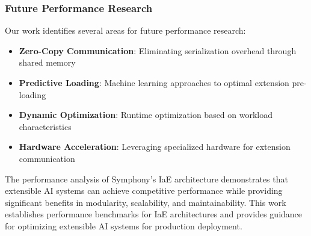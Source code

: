\subsubsection{Future Performance Research}

Our work identifies several areas for future performance research:

\begin{itemize}
    \item \textbf{Zero-Copy Communication}: Eliminating serialization overhead through shared memory
    \item \textbf{Predictive Loading}: Machine learning approaches to optimal extension pre-loading
    \item \textbf{Dynamic Optimization}: Runtime optimization based on workload characteristics
    \item \textbf{Hardware Acceleration}: Leveraging specialized hardware for extension communication
\end{itemize}

The performance analysis of Symphony's IaE architecture demonstrates that extensible AI systems can achieve competitive performance while providing significant benefits in modularity, scalability, and maintainability. This work establishes performance benchmarks for IaE architectures and provides guidance for optimizing extensible AI systems for production deployment.
